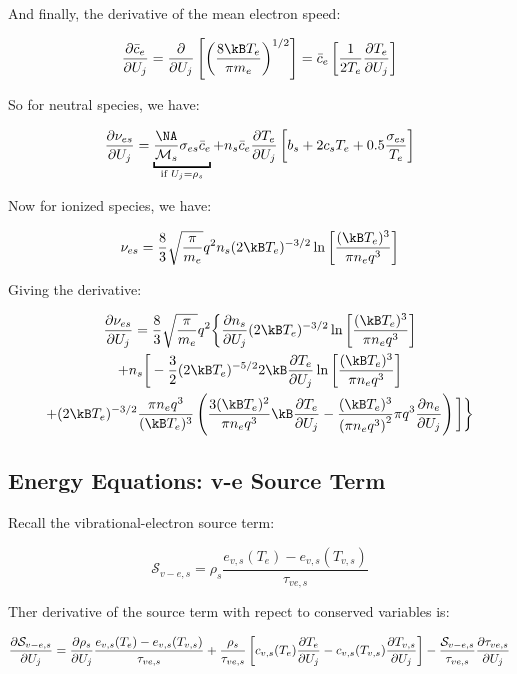\documentclass[10pt]{article}
\begin{document}
\begin{flushleft}
And finally, the derivative of the mean electron speed:

\begin{equation}
    \pd{\bar{c}_e}{U_j} = \pd{}{U_j} \bb{\bp{\frac{8 \kB T_e}{\pi m_e}}^{1/2}} = \bar{c}_e \bb{\frac{1}{2 T_e} \pd{T_e}{U_j}}   
\end{equation}

So for neutral species, we have:

\begin{equation}
    \pd{\nu_{es}}{U_j} = \ub{\frac{\NA}{\mathcal{M}_s} \sigma_{es} \bar{c}_{e}}{\text{if } U_j = \rho_s} + n_s \bar{c}_e \pd{T_e}{U_j} \bb{b_s + 2 c_s T_e + 0.5 \frac{\sigma_{es}}{T_e}} 
\end{equation}

Now for ionized species, we have:

\begin{equation}
    \nu_{es} = \frac{8}{3} \sqrt{\frac{\pi}{m_e}} q^2 n_s(2 \kB T_e)^{-3/2} \ln \bb{\frac{(\kB T_e)^3}{\pi n_e q^3}}
\end{equation}

Giving the derivative:

\begin{multline}
    \pd{\nu_{es}}{U_j} = \frac{8}{3} \sqrt{\frac{\pi}{m_e}} q^2 \bigg\{ \pd{n_s}{U_j} (2 \kB T_e)^{-3/2} \ln \bb{\frac{(\kB T_e)^3}{\pi n_e q^3}} 
    \\ +  n_s \bigg[ - \frac{3}{2} (2 \kB T_e)^{-5/2} 2 \kB \pd{T_e}{U_j} \ln \bb{\frac{(\kB T_e)^3}{\pi n_e q^3}} 
    \\ + (2 \kB T_e)^{-3/2} \frac{\pi n_e q^3}{(\kB T_e)^3} \bp{ \frac{3 (\kB T_e)^2}{\pi n_e q^3} \kB \pd{T_e}{U_j} - \frac{(\kB T_e)^3}{\bp{\pi n_e q^3}^2} \pi q^3 \pd{n_e}{U_j}  }  \bigg] \bigg\}
\end{multline}

\subsection{Energy Equations: v-e Source Term}

Recall the vibrational-electron source term:

\begin{equation}
    \mathcal{S}_{v-e,s} = \rho_s \frac{e_{v,s}(T_e) - e_{v,s}(T_{v,s})}{\tau_{ve,s}}
\end{equation}

Ther derivative of the source term with repect to conserved variables is:

\begin{equation}
    \frac{\partial \mathcal{S}_{v-e,s}}{\partial U_j} = \frac{\partial \rho_s}{\partial U_j} \frac{e_{v,s}(T_e) - e_{v,s}(T_{v,s})}{\tau_{ve,s}} + \frac{\rho_s}{\tau_{ve,s}} \left[ c_{v,s}(T_e) \frac{\partial T_e}{\partial U_j} - c_{v,s}(T_{v,s}) \frac{\partial T_{v,s}}{\partial U_j} \right] - \frac{\mathcal{S}_{v-e,s}}{\tau_{ve,s}} \frac{\partial \tau_{ve,s}}{\partial U_j} 
\end{equation}



\end{flushleft}
\end{document}
